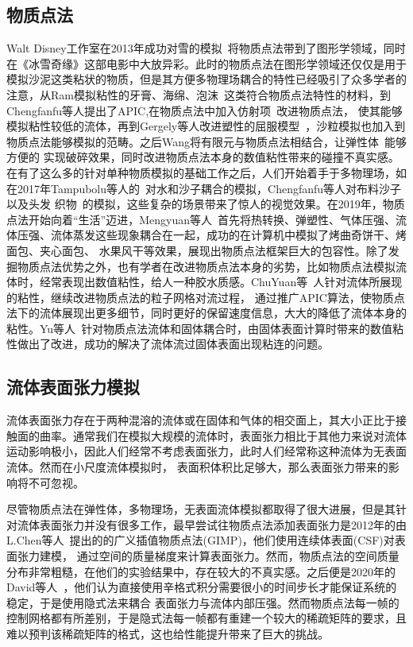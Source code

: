 \subsection{物质点法}
Walt Disney工作室在2013年成功对雪的模拟~\cite{stomakhin2013material}将物质点法带到了图形学领域，同时在《冰雪奇缘》这部电影中大放异彩。此时的物质点法在图形学领域还仅仅是用于
模拟沙泥这类粘状的物质，但是其方便多物理场耦合的特性已经吸引了众多学者的注意，从Ram模拟粘性的牙膏、海绵、泡沫~\cite{2015foams}这类符合物质点法特性的材料，到Chengfanfu等人提出了APIC,在物质点法中加入仿射项~\cite{jiang2015affine}改进物质点法，
使其能够模拟粘性较低的流体，再到Gergely等人改进塑性的屈服模型~\cite{klar2016drucker}，沙粒模拟也加入到物质点法能够模拟的范畴。之后Wang将有限元与物质点法相结合，让弹性体~\cite{2019WangDuctile}能够方便的
实现破碎效果，同时改进物质点法本身的数值粘性带来的碰撞不真实感。在有了这么多的针对单种物质模拟的基础工作之后，人们开始着手于多物理场，如在2017年Tampubolu等人的~\cite{tampubolon2017multi}对水和沙子耦合的模拟，Chengfanfu等人对布料沙子以及头发
织物~\cite{jiang2017anisotropic}的模拟，这些复杂的场景带来了惊人的视觉效果。在2019年，物质点法开始向着“生活”迈进，Mengyuan等人~\cite{Ding2019}首先将热转换、弹塑性、气体压强、流体压强、流体蒸发这些现象耦合在一起，成功的在计算机中模拟了烤曲奇饼干、烤面包、夹心面包、
水果风干等效果，展现出物质点法框架巨大的包容性。除了发掘物质点法优势之外，也有学者在改进物质点法本身的劣势，比如物质点法模拟流体时，经常表现出数值粘性，给人一种胶水质感。ChuYuan等~\cite{fu2017polynomial}人针对流体所展现的粘性，继续改进物质点法的粒子网格对流过程，
通过推广APIC算法，使物质点法下的流体展现出更多细节，同时更好的保留速度信息，大大的降低了流体本身的粘性。Yu等人~\cite{fang2020iq}针对物质点法流体和固体耦合时，由固体表面计算时带来的数值粘性做出了改进，成功的解决了流体流过固体表面出现粘连的问题。

\subsection{流体表面张力模拟}
流体表面张力存在于两种混溶的流体或在固体和气体的相交面上，其大小正比于接触面的曲率。通常我们在模拟大规模的流体时，表面张力相比于其他力来说对流体运动影响极小，因此人们经常不考虑表面张力，此时人们经常称这种流体为无表面流体。然而在小尺度流体模拟时，
表面积体积比足够大，那么表面张力带来的影响将不可忽视。

尽管物质点法在弹性体，多物理场，无表面流体模拟都取得了很大进展，但是其针对流体表面张力并没有很多工作，最早尝试往物质点法添加表面张力是2012年的由L.Chen等人~\cite{chen2012modeling}提出的的广义插值物质点法(GIMP)，他们使用连续体表面(CSF)对表面张力建模，
通过空间的质量梯度来计算表面张力。然而，物质点法的空间质量分布非常粗糙，在他们的实验结果中，存在较大的不真实感。之后便是2020年的David等人~\cite{hyde2020implicit}，他们认为直接使用辛格式积分需要很小的时间步长才能保证系统的稳定，于是使用隐式法来耦合
表面张力与流体内部压强。然而物质点法每一帧的控制网格都有所差别，于是隐式法每一帧都有重建一个较大的稀疏矩阵的要求，且难以预判该稀疏矩阵的格式，这也给性能提升带来了巨大的挑战。

